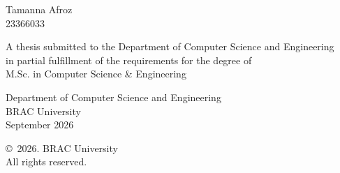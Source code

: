 \begin{titlepage}
\renewcommand*{\thepage}{Title} %

    \begin{center} 
        \vspace*{3cm} %
        
        {\fontsize{16pt}{22pt}\selectfont{Combining Reconstruction and Non-Heuristic Joint-Embedding Learning for Bengali Speech}
        } %
        
        \vspace{1.5cm}
        
        
        \vspace{0.5cm}
        
        	Tamanna Afroz\\
	        23366033\\

        \vspace{1.5cm}
        
        	A thesis submitted to the Department of Computer Science and Engineering\\
            in partial fulfillment of the requirements for the degree of\\
            M.Sc. in Computer Science \& Engineering

        
        \vspace{2.5cm}
        
    		Department of Computer Science and Engineering\\
            BRAC University\\
            September 2026
        
        \vspace{3cm}
        
    		\copyright\ 2026. BRAC University\\
            All rights reserved.
    
    \end{center}

\end{titlepage}